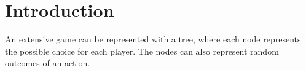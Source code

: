 \section{Introduction}

An extensive game can be represented with a tree, where each node represents the possible choice for each player. 
The nodes can also represent random outcomes of an action. 